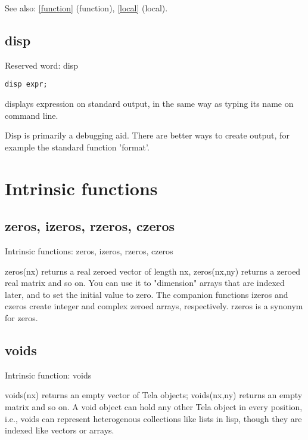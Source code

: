 \documentclass[a4paper]{article}
\begin{document}
See also: \ref{function} {(function)}, \ref{local} {(local)}.




\subsection{disp\label{disp}}

Reserved word: disp

\begin{tscreen}
\begin{verbatim}
disp expr;
\end{verbatim}
\end{tscreen}

displays expression on standard output, in the same way as
typing its name on command line.

Disp is primarily a debugging aid. There are better ways to
create output, for example the standard function 'format'.




\section{Intrinsic functions}


\subsection{zeros, izeros, rzeros, czeros\label{zeros}}

Intrinsic functions: zeros, izeros, rzeros, czeros

zeros(nx) returns a real zeroed vector of length nx, zeros(nx,ny)
returns a zeroed real matrix and so on. You can use it to "dimension"
arrays that are indexed later, and to set the initial value to
zero. The companion functions izeros and czeros create integer and
complex zeroed arrays, respectively. rzeros is a synonym for zeros.




\subsection{voids\label{voids}}

Intrinsic function: voids

voids(nx) returns an empty vector of Tela objects; voids(nx,ny)
returns an empty matrix and so on.  A void object can hold any other
Tela object in every position, i.e., voids can represent heterogenous
collections like lists in lisp, though they are indexed like vectors
or arrays.
\end{document}
